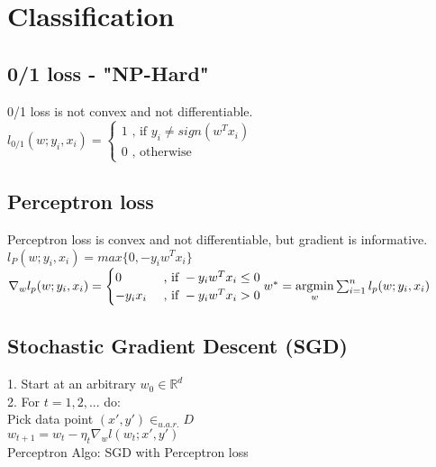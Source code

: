 \section*{Classification}
\subsection*{0/1 loss - "NP-Hard"}
0/1 loss is not convex and not differentiable.\\
$l_{0/1} (w;y_i,x_i) =
\begin{cases}
    1 \text{ , if } y_i \neq sign(w^Tx_i)\\
		0 \text{ , otherwise} 
\end{cases}$

\subsection*{Perceptron loss}
Perceptron loss is convex and not differentiable, but gradient is informative.\\
$l_{P} (w;y_i,x_i) = max\{0, -y_i w^T x_i \}$\\
$\nabla_w l_p(w;y_i,x_i) = \begin{cases}
    0 &\text{ , if } -y_i w^T x_i \leq 0\\
    -y_i x_i &\text{ , if } -y_i w^T x_i > 0
\end{cases}\\
w^* = \underset{w}{\operatorname{argmin}} \sum_{i=1}^n l_p (w;y_i,x_i)$

\subsection*{Stochastic Gradient Descent (SGD)}
1. Start at an arbitrary $w_0 \in \mathbb{R}^d$\\
2. For $t = 1, 2,  ...$ do: \\
	Pick data point $(x',y') \in_{u.a.r.} D$\\
	$w_{t+1} = w_t - \eta_t \nabla_w l(w_t;x',y')$\\
Perceptron Algo: SGD with Perceptron loss


